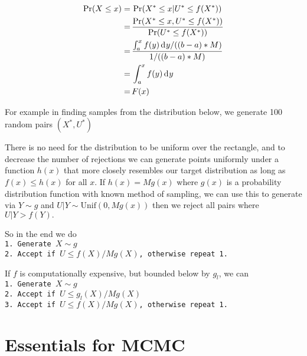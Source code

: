\begin{align*}
    \Pr(X \leq x) =\, & \Pr(X^* \leq x|U^*\leq f(X^*))                              \\
    =\,               & \frac{\Pr(X^* \leq x, U^*\leq f(X^*))}{\Pr(U^*\leq f(X^*))} \\
    =\,               & \frac{\int_a^xf(y)\diff y/((b - a)*M)}{1/((b - a)*M)}       \\
    =\,               & \int_a^xf(y)\diff y                                         \\
    =\,               & F(x)
\end{align*}

For example in finding samples from the distribution below, we generate 100 random pairs $(X^*, U^*)$



There is no need for the distribution to be uniform over the rectangle, and to 
decrease the number of rejections we can generate points uniformly under a 
function $h(x)$ that more closely resembles our target distribution as long as 
$f(x)\leq h(x)$ for all $x$. If $h(x) = Mg(x)$ where $g(x)$ is a probability 
distribution function with known method of sampling, we can use this to 
generate via $Y\sim g$ and $U|Y\sim \mathrm{Unif}(0, Mg(x))$ then we reject 
all pairs where $U|Y>f(Y).$

So in the end we do\texttt{\\
    1. Generate $X\sim g$\\
    2. Accept if $U\leq f(X)/Mg(X)$, otherwise repeat 1.}

If $f$ is computationally expensive, but bounded below by $g_l$, we can \texttt{\\
    1. Generate $X\sim g$\\
    2. Accept if $U\leq g_l(X)/Mg(X)$\\
    3. Accept if $U\leq f(X)/Mg(X)$, otherwise repeat 1.}

\section{Essentials for MCMC}\label{Markov_chains}

